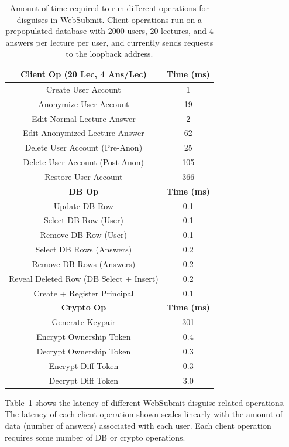 \begin{table}[t!]
\begin{center}
\begin{tabular}{ c c }
    \textbf{Client Op (20 Lec, 4 Ans/Lec)} & \textbf{Time (ms)}\\
\hline
    Create User Account & 1\\
    Anonymize User Account & 19\\
    Edit Normal Lecture Answer & 2 \\
    Edit Anonymized Lecture Answer & 62 \\
    Delete User Account (Pre-Anon) & 25 \\
    Delete User Account (Post-Anon) & 105 \\
    Restore User Account & 366 \\
\hline
    \textbf{DB Op} & \textbf{Time (ms)}\\
\hline
Update DB Row & 0.1\\ 
Select DB Row (User) & 0.1\\
Remove DB Row (User) & 0.1\\
Select DB Rows (Answers) & 0.2\\
Remove DB Rows (Answers) & 0.2\\
Reveal Deleted Row (DB Select + Insert) & 0.2 \\
Create + Register Principal & 0.1\\
\hline
    \textbf{Crypto Op} & \textbf{Time (ms)}\\
\hline
Generate Keypair & 301\\
Encrypt Ownership Token & 0.4\\
Decrypt Ownership Token & 0.3\\
Encrypt Diff Token & 0.3\\
Decrypt Diff Token & 3.0\\
\end{tabular}
\end{center}
\caption{Amount of time required to run different operations for disguises in WebSubmit. Client operations run on a prepopulated database with 2000 users, 20 lectures, and 4 answers per
    lecture per user, and currently sends requests to the loopback address.}
    \label{tab:opstats}
\end{table}

Table~\ref{tab:opstats} shows the latency of different WebSubmit disguise-related operations.  The
latency of each client operation shown scales linearly with the amount of data (\ie number of
answers) associated with each user. Each client operation requires some number of DB or crypto
operations.

